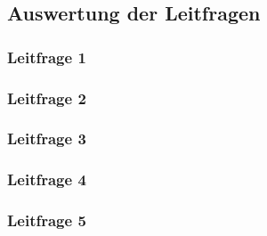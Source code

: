\documentclass[../../main.tex]{subfiles}
\begin{document}
\newpage
\subsection{Auswertung der Leitfragen}

\subsubsection{Leitfrage 1}
\label{leitfrage1}


\newpage
\subsubsection{Leitfrage 2}
\label{leitfrage2}


\newpage
\subsubsection{Leitfrage 3}
\label{leitfrage3}


\newpage
\subsubsection{Leitfrage 4}
\label{leitfrage4}


\newpage
\subsubsection{Leitfrage 5}
\label{leitfrage5}

\end{document}
